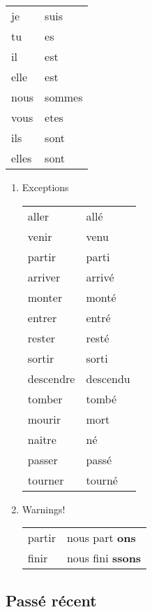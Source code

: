 \documentclass[11pt]{article}
\begin{document}
\begin{center}
\begin{tabular}{ll}
je & suis\\
tu & es\\
il & est\\
elle & est\\
nous & sommes\\
vous & etes\\
ils & sont\\
elles & sont\\
\end{tabular}
\end{center}

\begin{enumerate}
\item Exceptions
\label{sec-1-1-2-1}

\begin{center}
\begin{tabular}{ll}
aller & allé\\
venir & venu\\
partir & parti\\
arriver & arrivé\\
monter & monté\\
entrer & entré\\
rester & resté\\
sortir & sorti\\
descendre & descendu\\
tomber & tombé\\
mourir & mort\\
naitre & né\\
passer & passé\\
tourner & tourné\\
\end{tabular}
\end{center}

\item Warnings!
\label{sec-1-1-2-2}

\begin{center}
\begin{tabular}{ll}
partir & nous part \textbf{ons}\\
finir & nous fini \textbf{ssons}\\
\end{tabular}
\end{center}
\end{enumerate}

\subsection{Passé récent}
\label{sec-1-2}
\end{document}
